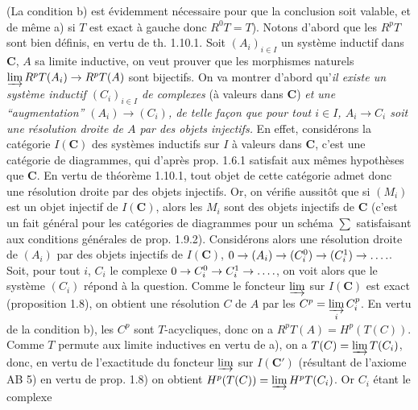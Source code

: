 (La condition b) est évidemment nécessaire pour que la conclusion soit
valable, et de même a) si $T$ est exact à gauche donc $R^0T=T$). Notons
d'abord que les $R^pT$ sont bien définis, en vertu de th. 1.10.1. Soit
$(A_i)_{i\in I}$ un système inductif dans $\mathbf C$, $A$ sa limite inductive, on veut
prouver que les morphismes naturels
$\varinjlim R^pT(A_i)\to R^pT(A)$
sont bijectifs.
On va montrer d'abord qu'\textit{il existe un système inductif $(C_i)_{i\in I}$ de
complexes }(à valeurs dans $\mathbf C$)\textit{ et une ``augmentation''
$(A_i)\to(C_i)$, de telle façon que pour tout $i\in I$,
$A_i\to C_i$ soit une résolution droite de $A$ par des objets
injectifs.}
En effet, considérons la catégorie $I(\mathbf C)$ des systèmes inductifs sur $I$ à
valeurs dans $\mathbf C$, c'est une catégorie de diagrammes, qui d'après prop. 1.6.1
satisfait aux mêmes hypothèses que $\mathbf C$. En vertu de théorème 1.10.1, tout objet
de cette catégorie admet donc une résolution droite par des objets injectifs.
Or, on vérifie aussitôt que si $(M_i)$ est un objet injectif de $I(\mathbf C)$, alors
les $M_i$ sont des objets injectifs de $\mathbf C$ (c'est un fait général pour les
catégories de diagrammes pour un schéma $\displaystyle\sum$ satisfaisant aux conditions
générales de prop. 1.9.2). Considérons alors une résolution droite de $(A_i)$
par des objets injectifs de $I(\mathbf C)$,
$0\to(A_i)\to(C_i^0)\to(C_i^1)\to\mathinner{.\,.\,.\,.}$.
Soit, pour tout $i$, $C_i$ le complexe
$0\to C_i^0\to C_i^1\to\mathinner{.\,.\,.\,.}$,
on voit alors que le système $(C_i)$ répond à la question.
Comme le foncteur $\varinjlim$ sur $I(\mathbf C)$ est exact (proposition 1.8), on
obtient une résolution $C$ de $A$ par les
$C^p=\varinjlim\limits_i C_i^p$.
En vertu de la condition b), les $C^p$ sont $T$-acycliques, donc on a
$R^pT(A)=H^p(T(C))$.
Comme $T$ permute aux limite inductives en vertu de a), on a
$T(C)=\varinjlim T(C_i)$,
donc, en vertu de l'exactitude du foncteur $\varinjlim$ sur $I(\mathbf C')$
(résultant de l'axiome AB 5) en vertu de prop. 1.8) on obtient
$H^p(T(C))=\varinjlim H^pT(C_i)$.
Or $C_i$ étant le complexe

